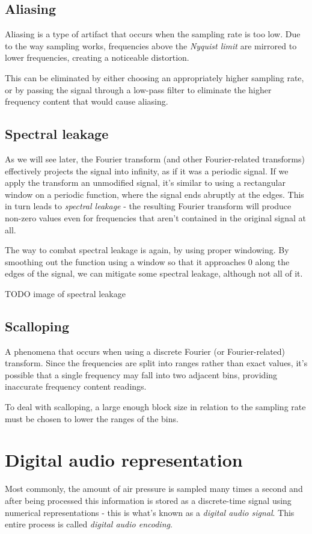\subsection{Aliasing}
Aliasing is a type of artifact that occurs when the sampling rate is too low. Due to the way sampling works, frequencies above the \emph{Nyquist limit} are mirrored to lower frequencies, creating a noticeable distortion. \cite{bosi_goldberg_2003}

This can be eliminated by either choosing an appropriately higher sampling rate, or by passing the signal through a low-pass filter to eliminate the higher frequency content that would cause aliasing.

\subsection{Spectral leakage}
As we will see later, the Fourier transform (and other Fourier-related transforms) effectively projects the signal into infinity, as if it was a periodic signal. If we apply the transform an unmodified signal, it's similar to using a rectangular window on a periodic function, where the signal ends abruptly at the edges. This in turn leads to \emph{spectral leakage} - the resulting Fourier transform will produce non-zero values even for frequencies that aren't contained in the original signal at all.

The way to combat spectral leakage is again, by using proper windowing. By smoothing out the function using a window so that it approaches $0$ along the edges of the signal, we can mitigate some spectral leakage, although not all of it.

TODO image of spectral leakage

\subsection{Scalloping}
A phenomena that occurs when using a discrete Fourier (or Fourier-related) transform. Since the frequencies are split into ranges rather than exact values, it's possible that a single frequency may fall into two adjacent bins, providing inaccurate frequency content readings.

To deal with scalloping, a large enough block size in relation to the sampling rate must be chosen to lower the ranges of the bins.

\section{Digital audio representation}
Most commonly, the amount of air pressure is sampled many times a second and after being processed this information is stored as a discrete-time signal using numerical representations - this is what's known as a \emph{digital audio signal}. This entire process is called \emph{digital audio encoding}.

